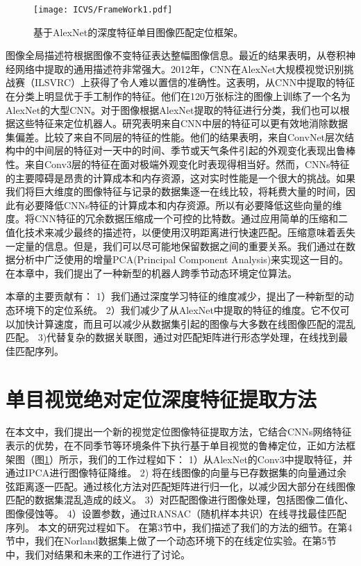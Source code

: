 \begin{figure}[t]
  \centering
  \texttt{[image: ICVS/FrameWork1.pdf]}
  \caption{基于AlexNet的深度特征单目图像匹配定位框架。}  
  \label{fig:Framework}
\end{figure}
图像全局描述符根据图像不变特征表达整幅图像信息。最近的结果表明，从卷积神经网络中提取的通用描述符非常强大\cite{sharif2014cnn}。2012年，CNN在AlexNet大规模视觉识别挑战赛（ILSVRC）上获得了令人难以置信的准确性\cite{krizhevsky2012imagenet}。这表明，从CNN中提取的特征在分类上明显优于手工制作的特征。他们在120万张标注的图像上训练了一个名为AlexNet的大型CNN。对于图像根据AlexNet提取的特征进行分类，我们也可以根据这些特征来定位机器人。\cite{donahue2014decaf}研究表明来自CNN中层的特征可以更有效地消除数据集偏差。\cite{sunderhauf2015performance}比较了来自不同层的特征的性能。他们的结果表明，来自ConvNet层次结构中的中间层的特征对一天中的时间、季节或天气条件引起的外观变化表现出鲁棒性。来自Conv3层的特征在面对极端外观变化时表现得相当好。然而，CNNs特征的主要障碍是昂贵的计算成本和内存资源，这对实时性能是一个很大的挑战。如果我们将巨大维度的图像特征与记录的数据集逐一在线比较，将耗费大量的时间，因此有必要降低CNNs特征的计算成本和内存资源。所以有必要降低这些向量的维度。\cite{arroyo2016fusion}将CNN特征的冗余数据压缩成一个可控的比特数。通过应用简单的压缩和二值化技术来减少最终的描述符，以便使用汉明距离进行快速匹配。压缩意味着丢失一定量的信息。但是，我们可以尽可能地保留数据之间的重要关系。我们通过在数据分析中广泛使用的增量PCA(Principal Component Analysis)来实现这一目的。在本章中，我们提出了一种新型的机器人跨季节动态环境定位算法。

本章的主要贡献有：
1）我们通过深度学习特征的维度减少，提出了一种新型的动态环境下的定位系统。
2）我们减少了从AlexNet中提取的特征的维度。它不仅可以加快计算速度，而且可以减少从数据集引起的图像与大多数在线图像匹配的混乱匹配。
3)代替复杂的数据关联图，通过对匹配矩阵进行形态学处理，在线找到最佳匹配序列。
\section{单目视觉绝对定位深度特征提取方法}
在本文中，我们提出一个新的视觉定位图像特征提取方法，它结合CNNs网络特征表示的优势，在不同季节等环境条件下执行基于单目视觉的鲁棒定位，正如方法框架图（图\ref{fig:Framework}）所示，我们的工作过程如下：
1）从AlexNet的Conv3中提取特征，并通过IPCA进行图像特征降维。
2) 将在线图像的向量与已存数据集的向量通过余弦距离逐一匹配。通过核化方法对匹配矩阵进行归一化，以减少因大部分在线图像匹配的数据集混乱造成的歧义。
3）对匹配图像进行图像处理，包括图像二值化、图像侵蚀等。
4）设置参数，通过RANSAC（随机样本共识）在线寻找最佳匹配序列。
本文的研究过程如下。 在第3节中，我们描述了我们的方法的细节。在第4节中，我们在Norland数据集上做了一个动态环境下的在线定位实验。在第5节中，我们对结果和未来的工作进行了讨论。
